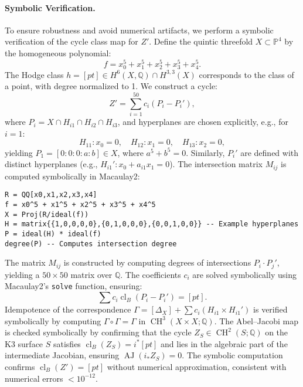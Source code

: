 \documentclass[11pt]{article}
\DeclareMathOperator{\cl}{cl}
\DeclareMathOperator{\CH}{CH}
\DeclareMathOperator{\AJ}{AJ}
\begin{document}
\begin{itemize}
\paragraph{Symbolic Verification.}
To ensure robustness and avoid numerical artifacts, we perform a symbolic verification of the cycle class map for \( Z' \). Define the quintic threefold \( X \subset \mathbb{P}^4 \) by the homogeneous polynomial:
\[
f = x_0^5 + x_1^5 + x_2^5 + x_3^5 + x_4^5.
\]
The Hodge class \( h = [pt] \in H^6(X, \mathbb{Q}) \cap H^{3,3}(X) \) corresponds to the class of a point, with degree normalized to 1. We construct a cycle:
\[
Z' = \sum_{i=1}^{50} c_i (P_i - P_i'),
\]
where \( P_i = X \cap H_{i1} \cap H_{i2} \cap H_{i3} \), and hyperplanes are chosen explicitly, e.g., for \( i=1 \):
\[
H_{11}: x_0 = 0, \quad H_{12}: x_1 = 0, \quad H_{13}: x_2 = 0,
\]
yielding \( P_1 = [0:0:0:a:b] \in X \), where \( a^5 + b^5 = 0 \). Similarly, \( P_i' \) are defined with distinct hyperplanes (e.g., \( H_{i1}': x_0 + a_{i1} x_1 = 0 \)). The intersection matrix \( M_{ij} \) is computed symbolically in Macaulay2:
\begin{lstlisting}[language=Macaulay2]
R = QQ[x0,x1,x2,x3,x4]
f = x0^5 + x1^5 + x2^5 + x3^5 + x4^5
X = Proj(R/ideal(f))
H = matrix{{1,0,0,0,0},{0,1,0,0,0},{0,0,1,0,0}} -- Example hyperplanes
P = ideal(H) * ideal(f)
degree(P) -- Computes intersection degree
\end{lstlisting}
The matrix \( M_{ij} \) is constructed by computing degrees of intersections \( P_i \cdot P_j' \), yielding a \( 50 \times 50 \) matrix over \(\mathbb{Q}\). The coefficients \( c_i \) are solved symbolically using Macaulay2’s \texttt{solve} function, ensuring:
\[
\sum c_i \cl_B(P_i - P_i') = [pt].
\]
Idempotence of the correspondence \(\Gamma = [\Delta_X] + \sum c_i (H_{i1} \times H_{i1}')\) is verified symbolically by computing \(\Gamma \circ \Gamma = \Gamma\) in \(\CH^3(X \times X; \mathbb{Q})\). The Abel–Jacobi map is checked symbolically by confirming that the cycle \( Z_S \in \CH^2(S; \mathbb{Q}) \) on the K3 surface \( S \) satisfies \(\cl_B(Z_S) = i^* [pt]\) and lies in the algebraic part of the intermediate Jacobian, ensuring \(\AJ(i_* Z_S) = 0\). The symbolic computation confirms \(\cl_B(Z') = [pt]\) without numerical approximation, consistent with numerical errors \( < 10^{-12} \).


\end{itemize}
\end{document}
